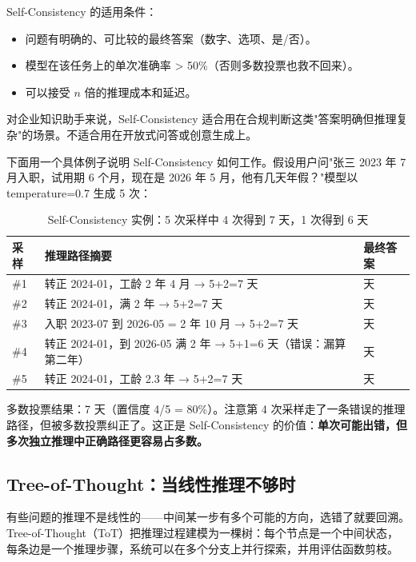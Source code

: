 Self-Consistency 的适用条件：
\begin{itemize}
  \item 问题有明确的、可比较的最终答案（数字、选项、是/否）。
  \item 模型在该任务上的单次准确率 > 50\%（否则多数投票也救不回来）。
  \item 可以接受 $n$ 倍的推理成本和延迟。
\end{itemize}

对企业知识助手来说，Self-Consistency 适合用在合规判断这类"答案明确但推理复杂"的场景。不适合用在开放式问答或创意生成上。

下面用一个具体例子说明 Self-Consistency 如何工作。假设用户问"张三 2023 年 7 月入职，试用期 6 个月，现在是 2026 年 5 月，他有几天年假？"模型以 temperature=0.7 生成 5 次：

\begin{table}[H]
\centering
\small
\begin{tabularx}{\textwidth}{>{\centering\arraybackslash}p{1.2cm}>{\raggedright\arraybackslash}X>{\centering\arraybackslash}p{1.5cm}}
\toprule
\textbf{采样} & \textbf{推理路径摘要} & \textbf{最终答案} \\
\midrule
\#1 & 转正 2024-01，工龄 2 年 4 月 → 5+2=7 天 & 7 天 \\
\#2 & 转正 2024-01，满 2 年 → 5+2=7 天 & 7 天 \\
\#3 & 入职 2023-07 到 2026-05 = 2 年 10 月 → 5+2=7 天 & 7 天 \\
\#4 & 转正 2024-01，到 2026-05 满 2 年 → 5+1=6 天（错误：漏算第二年） & 6 天 \\
\#5 & 转正 2024-01，工龄 2.3 年 → 5+2=7 天 & 7 天 \\
\bottomrule
\end{tabularx}
\caption{Self-Consistency 实例：5 次采样中 4 次得到 7 天，1 次得到 6 天}
\label{tab:self-consistency-example}
\end{table}

多数投票结果：7 天（置信度 4/5 = 80\%）。注意第 4 次采样走了一条错误的推理路径，但被多数投票纠正了。这正是 Self-Consistency 的价值：\textbf{单次可能出错，但多次独立推理中正确路径更容易占多数。}

\subsection{Tree-of-Thought：当线性推理不够时}
有些问题的推理不是线性的——中间某一步有多个可能的方向，选错了就要回溯。Tree-of-Thought（ToT）把推理过程建模为一棵树：每个节点是一个中间状态，每条边是一个推理步骤，系统可以在多个分支上并行探索，并用评估函数剪枝。

